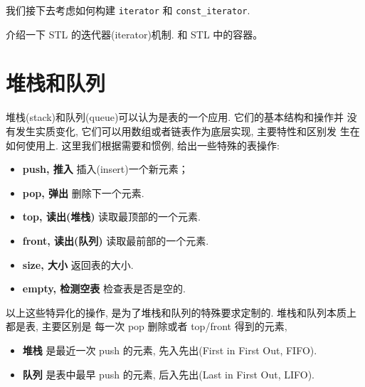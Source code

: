 \documentclass[a4paper]{ctexart}
\theoremstyle{definition}
\theoremstyle{definition}
\begin{document}





我们接下去考虑如何构建 \verb|iterator| 和 \verb|const_iterator|. 

介绍一下 STL 的迭代器(iterator)机制. 和 STL 中的容器。

\section{堆栈和队列}

堆栈(stack)和队列(queue)可以认为是表的一个应用. 它们的基本结构和操作并
没有发生实质变化, 它们可以用数组或者链表作为底层实现, 主要特性和区别发
生在如何使用上. 这里我们根据需要和惯例, 给出一些特殊的表操作:
\begin{itemize}
  \item {\bf push, 推入} 插入(insert)一个新元素；
  \item {\bf pop, 弹出} 删除下一个元素. 
  \item {\bf top, 读出(堆栈)} 读取最顶部的一个元素.
  \item {\bf front, 读出(队列)} 读取最前部的一个元素.
  \item {\bf size, 大小} 返回表的大小.
  \item {\bf empty, 检测空表} 检查表是否是空的.
  
\end{itemize}

以上这些特异化的操作, 是为了堆栈和队列的特殊要求定制的. 堆栈和队列本质上都是表, 主要区别是
每一次 pop 删除或者 top/front 得到的元素,
\begin{itemize}
\item {\bf 堆栈} 是最近一次 push 的元素, 先入先出(First in First Out,
  FIFO).
\item {\bf 队列} 是表中最早 push 的元素, 后入先出(Last in First Out,
  LIFO).
\end{itemize}
\end{document}
